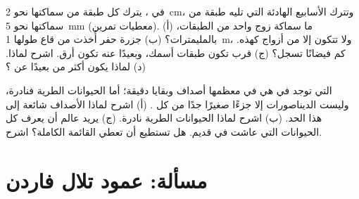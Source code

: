 \begin{exercise}[$\star\star\star$]\label{exo:g7:sediments-and-fossils:11}
في ، يترك كل  طبقة من  سماكتها نحو \qty{2}{cm}، وتترك
الأسابيع الهادئة التي تليه طبقة من  سماكتها نحو \qty{5}{mm}
(معطيات تمرين). (أ) ما سماكة زوج واحد من الطبقات، بالمليمترات؟ (ب) جزرة
حفر أُخذت من قاع  طولها \qty{1}{m}، ولا تتكون إلا من أزواج كهذه.
كم فيضانًا تسجل؟ (ج) قرب   تكون طبقات  أسمك، وبعيدًا عنه
تكون أرق. اشرح لماذا. (د) لماذا يكون  أكثر من  بعيدًا عن
؟
\end{exercise}

\begin{exercise}[$\star\star\star$]\label{exo:g7:sediments-and-fossils:12}
 التي توجد في  هي في معظمها أصداف وبقايا دقيقة؛ أما 
الحيوانات الطرية فنادرة، وليست الديناصورات إلا جزءًا صغيرًا جدًا من كل
. (أ) اشرح لماذا الأصداف شائعة إلى هذا الحد. (ب) اشرح لماذا
الحيوانات الطرية نادرة. (ج) يريد عالم أن يعرف كل الحيوانات التي عاشت في
 قديم. هل تستطيع  أن تعطي القائمة الكاملة؟ اشرح.
\end{exercise}

\section{مسألة: عمود تلال فاردن}

